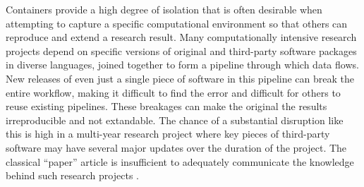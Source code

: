 Containers provide a high degree of isolation that is often desirable
when attempting to capture a specific computational environment so that
others can reproduce and extend a research result. Many computationally
intensive research projects depend on specific versions of original and
third-party software packages in diverse languages, joined together to
form a pipeline through which data flows. New releases of even just a
single piece of software in this pipeline can break the entire workflow,
making it difficult to find the error and difficult for others to reuse
existing pipelines. These breakages can make the original the results
irreproducible and not extandable. The chance of a substantial
disruption like this is high in a multi-year research project where key
pieces of third-party software may have several major updates over the
duration of the project. The classical ``paper'' article is insufficient
to adequately communicate the knowledge behind such research projects
\citep[cf.][]{donoho_invitation_2010,marwick_how_2015}.

